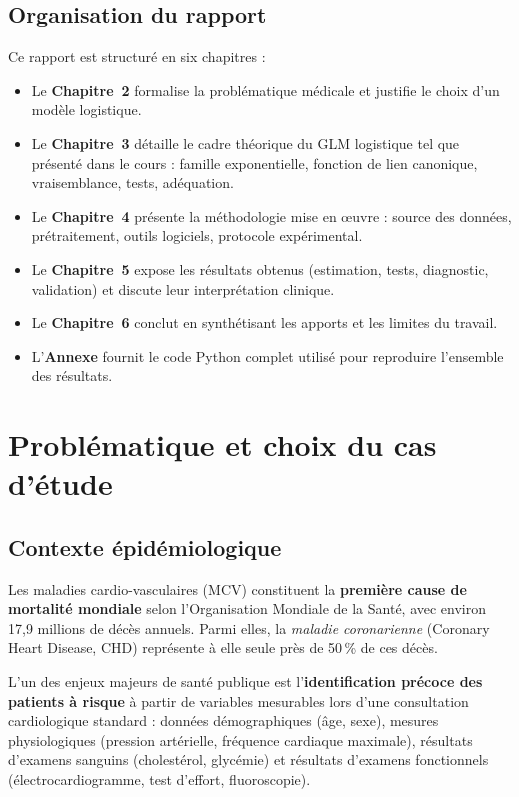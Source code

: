 \documentclass[11pt,a4paper,twoside]{report}
\theoremstyle{definition}
\begin{document}
\section{Organisation du rapport}

Ce rapport est structuré en six chapitres :

\begin{itemize}\itemsep0.2em
  \item Le \textbf{Chapitre~2} formalise la problématique médicale et
    justifie le choix d'un modèle logistique.
  \item Le \textbf{Chapitre~3} détaille le cadre théorique du GLM
    logistique tel que présenté dans le cours : famille exponentielle,
    fonction de lien canonique, vraisemblance, tests, adéquation.
  \item Le \textbf{Chapitre~4} présente la méthodologie mise en œuvre :
    source des données, prétraitement, outils logiciels, protocole
    expérimental.
  \item Le \textbf{Chapitre~5} expose les résultats obtenus
    (estimation, tests, diagnostic, validation) et discute leur
    interprétation clinique.
  \item Le \textbf{Chapitre~6} conclut en synthétisant les apports et
    les limites du travail.
  \item L'\textbf{Annexe} fournit le code Python complet utilisé pour
    reproduire l'ensemble des résultats.
\end{itemize}

\chapter{Problématique et choix du cas d'étude}

\section{Contexte épidémiologique}

Les maladies cardio-vasculaires (MCV) constituent la \textbf{première
cause de mortalité mondiale} selon l'Organisation Mondiale de la Santé,
avec environ 17,9 millions de décès annuels. Parmi elles, la
\emph{maladie coronarienne} (Coronary Heart Disease, CHD) représente à
elle seule près de 50\,\% de ces décès.

L'un des enjeux majeurs de santé publique est l'\textbf{identification
précoce des patients à risque} à partir de variables mesurables lors
d'une consultation cardiologique standard : données démographiques
(âge, sexe), mesures physiologiques (pression artérielle, fréquence
cardiaque maximale), résultats d'examens sanguins (cholestérol,
glycémie) et résultats d'examens fonctionnels (électrocardiogramme,
test d'effort, fluoroscopie).
\end{document}
